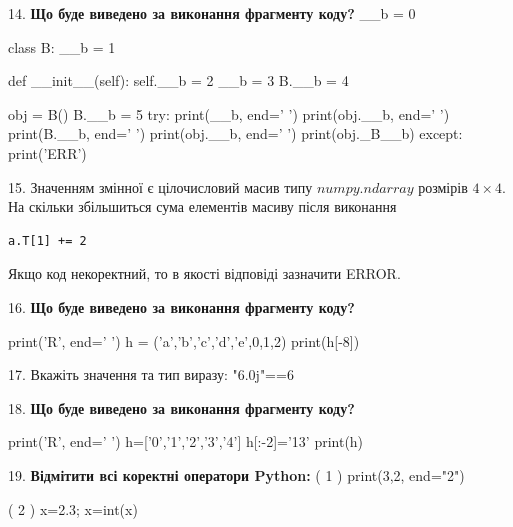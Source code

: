 \documentclass[11pt]{article}
\begin{document}
\par\vspace{5mm}

14. \textbf{Що буде виведено за виконання фрагменту коду?}
__b = 0

class B:
    __b = 1
    
    def __init__(self):
        self.__b = 2
        __b = 3
        B.__b = 4

obj = B()
B.__b = 5
try:
    print(__b, end=' ')
    print(obj.__b, end=' ')
    print(B.__b, end=' ')
    print(obj.__b, end=' ')
    print(obj._B__b)
except:
    print('ERR')
\par\vspace{5mm}

15. 
Значенням змінної  є цілочисловий масив типу $numpy.ndarray$ розмірів $4{\times}4$. На скільки збільшиться сума елементів масиву  після виконання
\begin{verbatim}
a.T[1] += 2
\end{verbatim}


Якщо код некоректний, то в якості відповіді зазначити ERROR.


\par\vspace{5mm}

16. \textbf{Що буде виведено за виконання фрагменту коду?}

print('R', end=' ')
h = ('a','b','c','d','e',0,1,2)
print(h[-8])

\par\vspace{5mm}

17. 
Вкажіть значення та тип виразу:
"6.0j"==6
\par\vspace{5mm}

18. \textbf{Що буде виведено за виконання фрагменту коду?}

print('R', end=' ')
h=['0','1','2','3','4']
h[:-2]='13'
print(h)

\par\vspace{5mm}

19. %
\textbf{Відмітити всі коректні оператори Python:}
( 1 ) print(3,2, end="2")

( 2 ) x=2.3; x=int(x)
\end{document}
